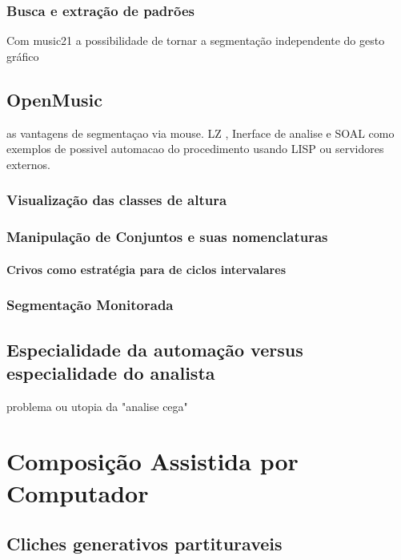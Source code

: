 \documentclass[
	12pt,				%
	openright,			%
	twoside,			%
	a4paper,			%
	english,			%
	french,				%
	spanish,			%
	brazil				%
	]{abntex2}
\begin{document}
\subsection{Busca e extração de padrões}

Com music21 a possibilidade de tornar a segmentação independente do gesto gráfico

\section{OpenMusic}

as vantagens de segmentaçao via mouse. LZ , Inerface de analise e SOAL como exemplos de possivel automacao do procedimento usando LISP ou servidores externos.

\subsection{Visualização das classes de altura}

\subsection{Manipulação de Conjuntos e suas nomenclaturas}

\subsubsection{Crivos como estratégia para de ciclos intervalares}

\subsection{Segmentação Monitorada}


\section{Especialidade da automação versus especialidade do analista}

problema ou utopia da "analise cega"


\chapter{Composição Assistida por Computador}

\section{Cliches generativos partituraveis}
\end{document}

